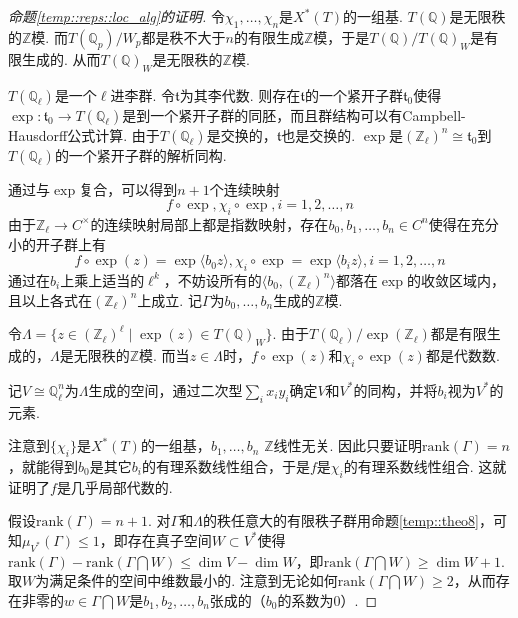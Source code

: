 \begin{proof}[命题\ref{temp::reps::loc_alg}的证明]

    令$\chi_1,\ldots,\chi_n$是$X^{*}(T)$的一组基.
    $T(\mathbb{Q})$是无限秩的$\mathbb{Z}$模.
    而$T(\mathbb{Q}_p)/W_p$都是秩不大于$n$的有限生成$\mathbb{Z}$模，于是$T(\mathbb{Q})/T(\mathbb{Q})_W$是有限生成的. 从而$T(\mathbb{Q})_W$是无限秩的$\mathbb{Z}$模.

    $T(\mathbb{Q}_{\ell})$是一个$\ell$进李群. 令$\mathfrak{t}$为其李代数. 则存在$\mathfrak{t}$的一个紧开子群$\mathfrak{t}_0$使得$\exp: \mathfrak{t}_0\to T(\mathbb{Q}_{\ell})$是到一个紧开子群的同胚，而且群结构可以有Campbell-Hausdorff公式计算. 由于$T(\mathbb{Q}_{\ell})$是交换的，$\mathfrak{t}$也是交换的. $\exp$是$(\mathbb{Z}_{\ell})^n\cong \mathfrak{t}_0$到$T(\mathbb{Q}_{\ell})$的一个紧开子群的解析同构.

    通过与$\exp$复合，可以得到$n+1$个连续映射
    \begin{equation}
        f\circ\exp, \chi_i\circ\exp, i=1,2,\ldots,n
    \end{equation}
    由于$\mathbb{Z}_{\ell}\to C^{\times}$的连续映射局部上都是指数映射，存在$b_0, b_1,\ldots,b_n \in C^n$使得在充分小的开子群上有
    \begin{equation}
        f\circ\exp(z) = \exp \langle b_0 z\rangle, \chi_i\circ\exp = \exp\langle b_i z\rangle, i=1,2,\ldots,n
    \end{equation}
    通过在$b_i$上乘上适当的$\ell^k$，不妨设所有的$\langle b_0, (\mathbb{Z}_{\ell})^n\rangle$都落在$\exp$的收敛区域内，且以上各式在$(\mathbb{Z}_{\ell})^n$上成立. 记$\Gamma$为$b_0, \ldots,b_n$生成的$\mathbb{Z}$模.

    令$\Lambda = \{z\in (\mathbb{Z}_{\ell})^{\ell}\mid \exp(z)\in T(\mathbb{Q})_{W}\}$. 由于$T(\mathbb{Q}_{\ell})/\exp(\mathbb{Z}_{\ell})$都是有限生成的，$\Lambda$是无限秩的$\mathbb{Z}$模. 而当$z\in \Lambda$时，$f\circ \exp(z)$和$\chi_i\circ\exp(z)$都是代数数.

    记$V\cong \mathbb{Q}_{\ell}^n$为$\Lambda$生成的空间，通过二次型$\sum_i x_iy_i$确定$V$和$V^{*}$的同构，并将$b_i$视为$V^{*}$的元素.
    
    注意到$\{\chi_i\}$是$X^{*}(T)$的一组基，$b_1,\ldots,b_n$ $\mathbb{Z}$线性无关. 因此只要证明$\mathrm{rank}(\Gamma)= n$，就能得到$b_0$是其它$b_i$的有理系数线性组合，于是$f$是$\chi_i$的有理系数线性组合. 这就证明了$f$是几乎局部代数的.

    假设$\mathrm{rank}(\Gamma) = n+1$. 对$\Gamma$和$\Lambda$的秩任意大的有限秩子群用命题\ref{temp::theo8}，可知$\mu_{V^{*}}(\Gamma)\leq 1$，即存在真子空间$W\subset V^{*}$使得$\mathrm{rank}(\Gamma) - \mathrm{rank}(\Gamma\bigcap W) \leq \dim V - \dim W$，即$\mathrm{rank}(\Gamma\bigcap W)\geq \dim W + 1$. 取$W$为满足条件的空间中维数最小的. 注意到无论如何$\mathrm{rank}(\Gamma\bigcap W)\geq 2$，从而存在非零的$w\in \Gamma\bigcap W$是$b_1, b_2,\ldots, b_n$张成的（$b_0$的系数为$0$）.


\end{proof}
